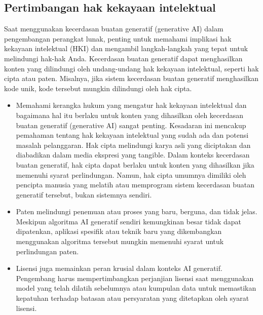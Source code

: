 \documentclass{article}
\begin{document}
\subsection{Pertimbangan hak kekayaan intelektual}
Saat menggunakan kecerdasan buatan generatif (generative AI) dalam pengembangan perangkat lunak, penting untuk memahami implikasi hak kekayaan intelektual (HKI) dan mengambil langkah-langkah yang tepat untuk melindungi hak-hak Anda. Kecerdasan buatan generatif dapat menghasilkan konten yang dilindungi oleh undang-undang hak kekayaan intelektual, seperti hak cipta atau paten. Misalnya, jika sistem kecerdasan buatan generatif menghasilkan kode unik, kode tersebut mungkin dilindungi oleh hak cipta.
\begin{itemize}
    \item Memahami kerangka hukum yang mengatur hak kekayaan intelektual dan bagaimana hal itu berlaku untuk konten yang dihasilkan oleh kecerdasan buatan generatif (generative AI) sangat penting. Kesadaran ini mencakup pemahaman tentang hak kekayaan intelektual yang sudah ada dan potensi masalah pelanggaran. Hak cipta melindungi karya asli yang diciptakan dan diabadikan dalam media ekspresi yang tangible. Dalam konteks kecerdasan buatan generatif, hak cipta dapat berlaku untuk konten yang dihasilkan jika memenuhi syarat perlindungan. Namun, hak cipta umumnya dimiliki oleh pencipta manusia yang melatih atau memprogram sistem kecerdasan buatan generatif tersebut, bukan sistemnya sendiri.
    \item Paten melindungi penemuan atau proses yang baru, berguna, dan tidak jelas. Meskipun algoritma AI generatif sendiri kemungkinan besar tidak dapat dipatenkan, aplikasi spesifik atau teknik baru yang dikembangkan menggunakan algoritma tersebut mungkin memenuhi syarat untuk perlindungan paten.
    \item Lisensi juga memainkan peran krusial dalam konteks AI generatif. Pengembang harus mempertimbangkan perjanjian lisensi saat menggunakan model yang telah dilatih sebelumnya atau kumpulan data untuk memastikan kepatuhan terhadap batasan atau persyaratan yang ditetapkan oleh syarat lisensi.
\end{itemize}
\end{document}
